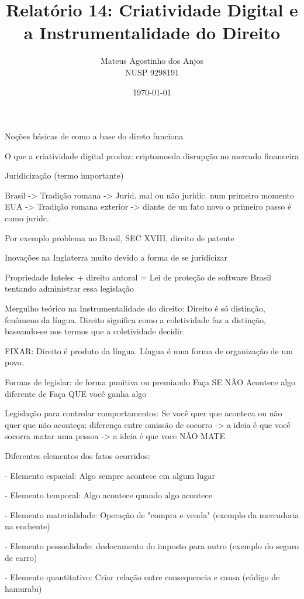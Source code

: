 \documentclass[12pt]{article}
\title{Relatório 14: Criatividade Digital e a Instrumentalidade do Direito}
\author{Mateus Agostinho dos Anjos\\NUSP 9298191}
\date{\today}
\begin{document}
	\maketitle
	\paragraph{}
	

Noções básicas de como a base do direto funciona

O que a criatividade digital produz:
	criptomoeda
	disrupção no mercado financeira

Juridicização (termo importante)

Brasil -> Tradição romana -> Jurid. mal ou não juridic. num primeiro momento
EUA -> Tradição romana exterior -> diante de un fato novo o primeiro passo é
como juridc.

Por exemplo problema no Brasil, SEC XVIII, direito de patente

Inovações na Inglaterra muito devido a forma de se juridicizar 	

Propriedade Intelec + direito autoral = Lei de proteção de software
Brasil tentando administrar essa legislação

Mergulho teórico na Instrumentalidade do direito:
	Direito é só distinção, fenômeno da língua. Direito significa como a
	coletividade faz a distinção, baseando-se nos termos que a coletividade
	decidir.

	FIXAR: Direito é produto da língua.
	Língua é uma forma de organização de um povo.

Formas de legislar: de forma punitiva ou premiando
Faça SE NÃO Acontece algo diferente de Faça QUE você ganha algo

Legislação para controlar comportamentos: Se você quer que aconteca ou não quer
que não aconteça:
diferença entre omissão de socorro -> a ideia é que você socorra
matar uma pessoa -> a ideia é que voce NÂO MATE	

Diferentes elementos dos fatos ocorridos:

- Elemento espacial: Algo sempre acontece em algum lugar

- Elemento temporal: Algo acontece quando algo acontece

- Elemento materialidade: Operação de "compra e venda" (exemplo da mercadoria
na enchente)

- Elemento pessoalidade: deslocamento do imposto para outro (exemplo do seguro
de carro)

- Elemento quantitativo: Criar relação entre consequencia e causa (código de
hamurabi)
\end{document}
